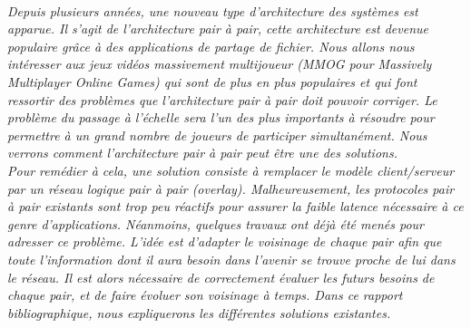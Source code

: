 \\
	\par \textit{Depuis plusieurs années, une nouveau type d'architecture des systèmes est apparue. Il s'agit de l'architecture pair à pair, cette architecture est devenue populaire grâce à des applications de partage de fichier. Nous allons nous intéresser aux jeux vidéos massivement multijoueur (MMOG pour Massively Multiplayer Online Games) qui sont de plus en plus populaires et qui font ressortir des problèmes que l'architecture pair à pair doit pouvoir corriger. Le problème du passage à l'échelle sera l'un des plus importants à résoudre pour permettre à un grand nombre de joueurs de participer simultanément. Nous verrons comment l'architecture pair à pair peut être une des solutions.\\ 
	 Pour remédier à cela, une solution consiste à remplacer le modèle client/serveur par un réseau logique pair à pair (overlay). Malheureusement, les protocoles pair à pair existants sont trop peu réactifs pour assurer la faible latence nécessaire à ce genre d’applications. Néanmoins, quelques travaux ont déjà été menés pour adresser ce problème. L’idée est d’adapter le voisinage de chaque pair afin que toute l’information dont il aura besoin dans l'avenir se trouve proche de lui dans le réseau. Il est alors nécessaire de correctement évaluer les futurs besoins de chaque pair, et de faire évoluer son voisinage à temps. Dans ce rapport bibliographique, nous expliquerons les différentes solutions existantes.}\\
